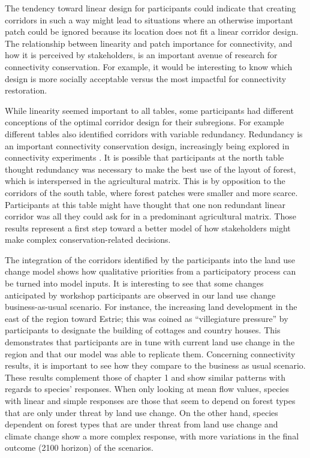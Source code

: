 {The tendency toward linear design for participants could indicate that creating corridors in such a way might lead to situations where an otherwise important patch could be ignored because its location does not fit a linear corridor design. The relationship between linearity and patch importance for connectivity, and how it is perceived by stakeholders, is an important avenue of research for connectivity conservation. For example, it would be interesting to know which design is more socially acceptable versus the most impactful for connectivity restoration. 

While linearity seemed important to all tables, some participants had different conceptions of the optimal corridor design for their subregions. For example different tables also identified corridors with variable redundancy. Redundancy is an important connectivity conservation design, increasingly being explored in connectivity experiments \citep{fletcher_matrix_2014}. It is possible that participants at the north table thought redundancy was necessary to make the best use of the layout of forest, which is interspersed in the agricultural matrix. This is by opposition to the corridors of the south table, where forest patches were smaller and more scarce. Participants at this table might have thought that one non redundant linear corridor was all they could ask for in a predominant agricultural matrix. Those results represent a first step toward a better model of how stakeholders might make complex conservation-related decisions. 

The integration of the corridors identified by the participants into the land use change model shows how qualitative priorities from a participatory process can be turned into model inputs. It is interesting to see that some changes anticipated by workshop participants are observed in our land use change business-as-usual scenario. For instance, the increasing land development in the east of the region toward Estrie; this was coined as “villegiature pressure” by participants to designate the building of cottages and country houses. This demonstrates that participants are in tune with current land use change in the region and that our model was able to replicate them. Concerning connectivity results, it is important to see how they compare to the business as usual scenario. These results complement those of chapter 1 and show similar patterns with regards to species’ responses. When only looking at mean flow values, species with linear and simple responses are those that seem to depend on forest types that are only under threat by land use change. On the other hand, species dependent on forest types that are under threat from land use change and climate change show a more complex response, with more variations in the final outcome (2100 horizon) of the scenarios. 

}
